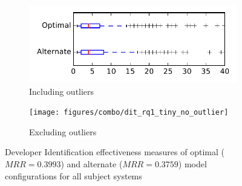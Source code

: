 
\begin{figure}
    \centering
    \begin{subfigure}{.4\textwidth}
        \centering
        \includegraphics[height=0.4\textheight]{figures/combo/dit_rq1_tiny}
        \caption{Including outliers}\label{fig:combo:dit:rq1:tiny_outlier}
    \end{subfigure}%
    \begin{subfigure}{.4\textwidth}
        \centering
        \texttt{[image: figures/combo/dit\_rq1\_tiny\_no\_outlier]}
        \caption{Excluding outliers}\label{fig:combo:dit:rq1:tiny_no_outlier}
    \end{subfigure}
\caption{Developer Identification effectiveness measures of optimal ($MRR=0.3993$) and alternate ($MRR=0.3759$) model configurations for all subject systems}
\label{fig:combo:dit:rq1:tiny}
\end{figure}
